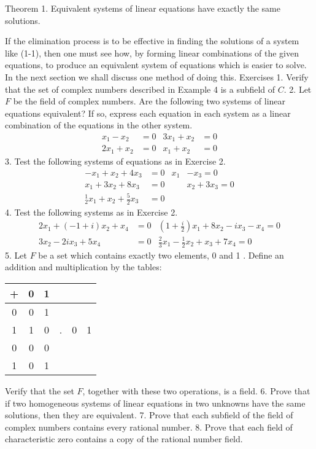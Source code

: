 Theorem 1. Equivalent systems of linear equations have exactly the same solutions.

If the elimination process is to be effective in finding the solutions of a system like (1-1), then one must see how, by forming linear combinations of the given equations, to produce an equivalent system of equations which is easier to solve. In the next section we shall discuss one method of doing this.
Exercises
1. Verify that the set of complex numbers described in Example 4 is a subfield of $C$.
2. Let $F$ be the field of complex numbers. Are the following two systems of linear equations equivalent? If so, express each equation in each system as a linear combination of the equations in the other system.
$$
\begin{array}{rlrl}
x_1-x_2 & =0 & 3 x_1+x_2 & =0 \\
2 x_1+x_2 & =0 & x_1+x_2 & =0
\end{array}
$$
3. Test the following systems of equations as in Exercise 2.
$$
\begin{aligned}
-x_1+x_2+4 x_3 & =0 & x_1 & -x_3=0 \\
x_1+3 x_2+8 x_3 & =0 & & x_2+3 x_3=0 \\
{ }_2^1 x_1+x_2+\frac{5}{2} x_3 & =0 & &
\end{aligned}
$$
4. Test the following systems as in Exercise 2.
$$
\begin{array}{rlr}
2 x_1+(-1+i) x_2+x_4 & =0 & \left(1+\frac{i}{2}\right) x_1+8 x_2-i x_3-x_4=0 \\
3 x_2-2 i x_3+5 x_4 & =0 & \frac{2}{3} x_1-\frac{1}{2} x_2+x_3+7 x_4=0
\end{array}
$$
5. Let $F$ be a set which contains exactly two elements, 0 and 1 . Define an addition and multiplication by the tables:
\begin{tabular}{c|ccc|cc}
+ & 0 & 1 \\
\hline 0 & 0 & 1 \\
1 & 1 & 0 &. & 0 & 1 \\
\hline 0 & 0 & 0 \\
1 & 0 & 1
\end{tabular}

Verify that the set $F$, together with these two operations, is a field.
6. Prove that if two homogeneous systems of linear equations in two unknowns have the same solutions, then they are equivalent.
7. Prove that each subfield of the field of complex numbers contains every rational number.
8. Prove that each field of characteristic zero contains a copy of the rational number field.
